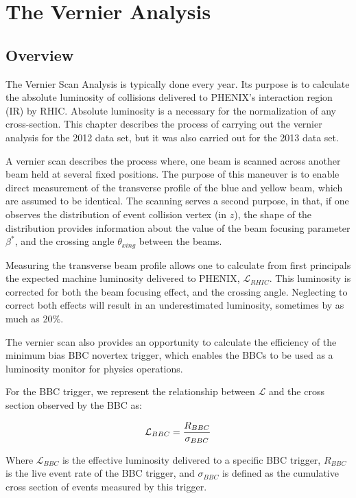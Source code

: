 \chapter{The Vernier Analysis}
\label{ch:vernier_analysis}
\section{Overview}

The Vernier Scan Analysis is typically done every year. Its purpose is to
calculate the absolute luminosity of collisions delivered to PHENIX's
interaction region (IR) by RHIC.  Absolute luminosity is a necessary for the
normalization of any cross-section. This chapter describes the process of
carrying out the vernier analysis for the 2012 data set, but it was also
carried out for the 2013 data set.

A vernier scan describes the process where, one beam is scanned across another
beam held at several fixed positions. The purpose of this maneuver is to enable
direct measurement of the transverse profile of the blue and yellow beam, which
are assumed to be identical. The scanning serves a second purpose, in that, if
one observes the distribution of event collision vertex (in $z$), the shape of
the distribution provides information about the value of the beam focusing
parameter $\beta^*$, and the crossing angle $\theta_{xing}$ between the beams.

Measuring the transverse beam profile allows one to calculate from first
principals the expected machine luminosity delivered to PHENIX,
$\mathcal{L}_{RHIC}$. This luminosity is corrected for both the beam focusing
effect, and the crossing angle. Neglecting to correct both effects will result
in an underestimated luminosity, sometimes by as much as 20\%.

The vernier scan also provides an opportunity to calculate the efficiency of the
minimum bias BBC novertex trigger, which enables the BBCs to be used as a
luminosity monitor for physics operations. 

For the BBC trigger, we represent the relationship between $\mathcal{L}$
and the cross section observed by the BBC as:

\begin{equation} 
\label{eq:lumi_xsec_simple} 
\mathcal{L}_{BBC} = {R_{BBC}\over\sigma_{BBC}} 
\end{equation}

{\noindent}Where $\mathcal{L}_{BBC}$ is the effective luminosity delivered to a
specific BBC trigger, $R_{BBC}$ is the live event rate of the BBC trigger, and
$\sigma_{BBC}$ is defined as the cumulative cross section of events measured by
this trigger.

